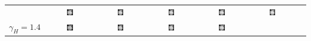 \begin{tabular}{ T S @{} S @{} S @{} S @{} S @{} S }
  & \includegraphics[width=0.135\textwidth]{../images/girl_3_13}
  & \includegraphics[width=0.135\textwidth]{../images/girl_4_13}
  & \includegraphics[width=0.135\textwidth]{../images/girl_5_13}
  & \includegraphics[width=0.135\textwidth]{../images/girl_6_13}
  & \includegraphics[width=0.135\textwidth]{../images/girl_7_13} \\ [-4pt]
  $\gamma_H=1.4$
  & \includegraphics[width=0.135\textwidth]{../images/girl_2_14}
  & \includegraphics[width=0.135\textwidth]{../images/girl_3_14}
  & \includegraphics[width=0.135\textwidth]{../images/girl_4_14}
  & \includegraphics[width=0.135\textwidth]{../images/girl_5_14}

\end{tabular}
